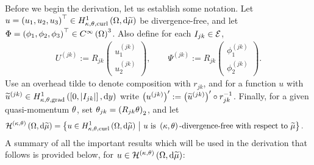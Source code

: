 Before we begin the derivation, let us establish some notation.
Let $u=\left( u_1,u_2,u_3 \right)^\top\in H^1_{\kappa,\theta,\mathrm{curl}}\left( \Omega, \mathrm{d}\widetilde{\mu} \right)$ be divergence-free, and let $\Phi=\left( \phi_1,\phi_2,\phi_3 \right)^\top\in C^{\infty}\left( \Omega \right)^3$.
Also define for each $I_{jk}\in\mathcal{E}$, 
\begin{align*}
	U^{(jk)} := R_{jk} \begin{pmatrix} u_1^{(jk)} \\ u_2^{(jk)} \end{pmatrix},
	\qquad
	\Psi^{(jk)} := R_{jk} \begin{pmatrix} \phi_1^{(jk)} \\ \phi_2^{(jk)} \end{pmatrix}.
\end{align*}
Use an overhead tilde to denote composition with $r_{jk}$, and for a function $u$ with $\widetilde{u}^{(jk)}\in H^1_{\kappa,\theta,\mathrm{grad}}\left( \left[ 0,\left\lvert I_{jk} \right\rvert \right], \mathrm{d}y \right)$ write $\left( u^{(jk)} \right)' := \left( \widetilde{u}^{(jk)} \right)' \circ r_{jk}^{-1}$.
Finally, for a given quasi-momentum $\theta$, set $\theta_{jk} = \left(  R_{jk}\theta  \right)_2$, and let
\begin{align*}
	\mathcal{H}^{\left( \kappa, \theta \right)}\left( \Omega, \mathrm{d}\widetilde{\mu} \right) &=
	\left\{  u\in H^1_{\kappa,\theta,\mathrm{curl}}\left( \Omega, \mathrm{d}\widetilde{\mu} \right) \ \middle\vert \  u \text{ is } \left( \kappa, \theta \right)\text{-divergence-free with respect to } \widetilde{\mu} \right\}.
\end{align*}
A summary of all the important results which will be used in the derivation that follows is provided below, for $u\in\mathcal{H}^{\left( \kappa, \theta \right)}\left( \Omega, \mathrm{d}\widetilde{\mu} \right)$:
